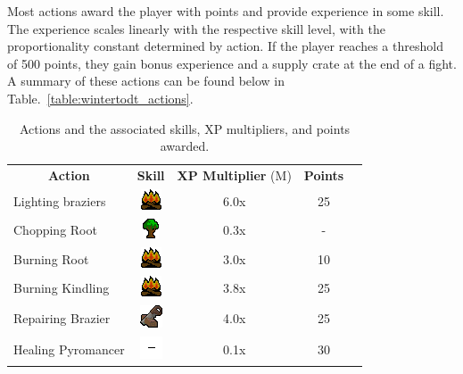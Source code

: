 Most actions award the player with points and provide experience in some skill. The experience scales linearly with the respective skill level, with the proportionality constant determined by action. If the player reaches a threshold of 500 points, they gain bonus experience and a supply crate at the end of a fight. A summary of these actions can be found below in Table.~\ref{table:wintertodt_actions}.
\begin{table}[H]
	\caption{Actions and the associated skills, XP multipliers, and points awarded.}
	\centering
	\begin{tabular}{lcccc}
		\multicolumn{1}{c}{\textbf{Action}} & \textbf{Skill}                                                                   & \textbf{XP Multiplier} (M) & \textbf{Points} \\
		Lighting braziers                   & \includegraphics[width=0.03\linewidth]{img/general/skills/Firemaking_icon.png}   & 6.0x                     & 25              \\
		Chopping Root                       & \includegraphics[width=0.03\linewidth]{img/general/skills/Woodcutting_icon.png}  & 0.3x                   & -               \\
		Burning Root                        & \includegraphics[width=0.03\linewidth]{img/general/skills/Firemaking_icon.png}   & 3.0x                     & 10              \\
		Burning Kindling                    & \includegraphics[width=0.03\linewidth]{img/general/skills/Firemaking_icon.png}   & 3.8x                   & 25              \\
		Repairing Brazier                   & \includegraphics[width=0.03\linewidth]{img/general/skills/Construction_icon.png} & 4.0x                     & 25              \\
		Healing Pyromancer                  & \includegraphics[width=0.03\linewidth]{img/general/skills/blank.png}             & 0.1x                   & 30              \\

\end{tabular}
\end{table}
